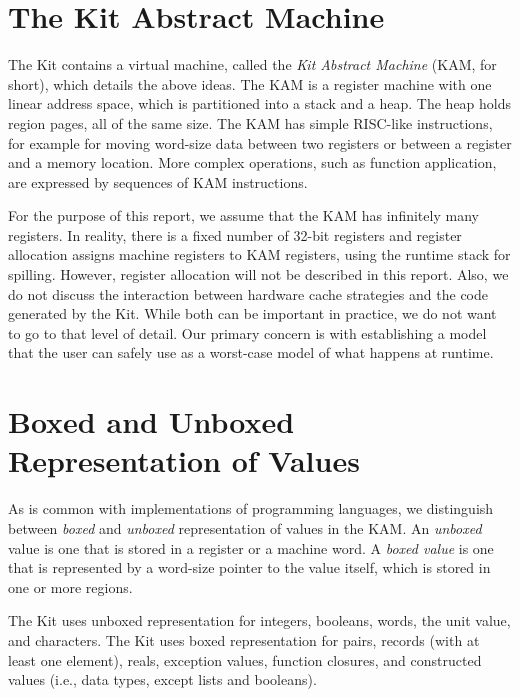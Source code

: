 \documentclass[12pt]{book}
\begin{document}
\section{The Kit Abstract Machine}
The Kit contains a virtual machine, called
the {\em Kit Abstract Machine} (KAM, for short), which details the
above ideas. The KAM is a register machine with one linear address
space, which is partitioned into a stack and a heap. The heap holds
region pages, all of the same size.  The KAM has simple RISC-like
instructions, for example for moving word-size data between two
registers or between a register and a memory location.  More complex
operations, such as function application, are expressed by sequences
of KAM instructions.

For the purpose of this report,
we assume that the KAM has infinitely many registers.
In reality, there is a fixed number of 32-bit registers and
register allocation assigns machine registers to KAM registers, using the runtime
stack for spilling. However, register allocation will not be described in this report.
Also, we do not discuss the interaction between hardware cache strategies and
the code generated by the Kit. While both can be important in practice, we do not want
to go to that level of detail. Our primary concern is with establishing a model that
the user can safely use as a worst-case model of what happens at runtime.

\section{Boxed and Unboxed Representation of Values}
\label{boxing.sec}
As is common with implementations of programming languages, 
we distinguish between {\em boxed\/} and {\em unboxed\/} representation
of values in the KAM.
An {\em unboxed\/} value is one that is stored in a register or
a machine word. A {\em boxed value\/} is one that is represented by
a word-size pointer to the value itself, which is stored in one or more
regions.

The Kit uses unboxed representation for integers, booleans, words, the
unit value, and characters.  The Kit uses boxed representation for
pairs, records (with at least one element), reals, exception values,
function closures, and constructed values (i.e., data types, except
lists and booleans).
\end{document}
